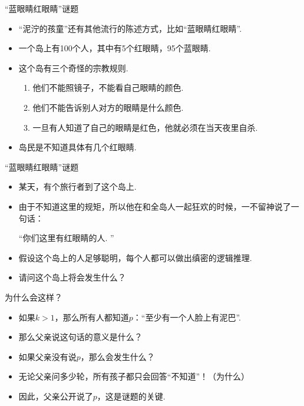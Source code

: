 \begin{frame}{“蓝眼睛红眼睛”谜题}
\begin{itemize}
    \item “泥泞的孩童”还有其他流行的陈述方式，比如“蓝眼睛红眼睛”.
    \item 一个岛上有100个人，其中有5个红眼睛，95个蓝眼睛.
    \item 这个岛有三个奇怪的宗教规则.
    \begin{enumerate}
        \item 他们不能照镜子，不能看自己眼睛的颜色. 
        \item 他们不能告诉别人对方的眼睛是什么颜色. 
        \item 一旦有人知道了自己的眼睛是红色，他就必须在当天夜里自杀.
    \end{enumerate}
    \item 岛民是不知道具体有几个红眼睛. 
\end{itemize}
\end{frame}

\begin{frame}{“蓝眼睛红眼睛”谜题}
\begin{itemize}
    \item 某天，有个旅行者到了这个岛上. 
    \item 由于不知道这里的规矩，所以他在和全岛人一起狂欢的时候，一不留神说了一句话：
    \begin{center}
        “你们这里有红眼睛的人. ”
    \end{center}
    \item 假设这个岛上的人足够聪明，每个人都可以做出缜密的逻辑推理. 
    \item 请问这个岛上将会发生什么？
\end{itemize}
\end{frame}

\begin{frame}{为什么会这样？}
\begin{itemize}
    \item 如果$k>1$，那么所有人都知道$p$：“至少有一个人脸上有泥巴”.
    \item 那么父亲说这句话的意义是什么？
    \item 如果父亲没有说$p$，那么会发生什么？
    \item 无论父亲问多少轮，所有孩子都只会回答“不知道”！（为什么）%
    \item 因此，父亲公开说了$p$，这是谜题的关键.
\end{itemize}
\end{frame}

